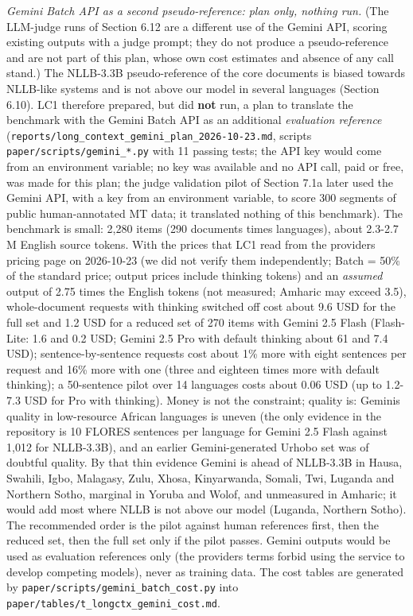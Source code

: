 \emph{Gemini Batch API as a second pseudo-reference: plan only, nothing run.} (The LLM-judge runs of Section 6.12 are a different use of the Gemini API, scoring existing outputs with a judge prompt; they do not produce a pseudo-reference and are not part of this plan, whose own cost estimates and absence of any call stand.) The NLLB-3.3B pseudo-reference of the core documents is biased towards NLLB-like systems and is not above our model in several languages (Section 6.10). LC1 therefore prepared, but did \textbf{not} run, a plan to translate the benchmark with the Gemini Batch API as an additional \emph{evaluation reference} (\texttt{reports/long\_context\_gemini\_plan\_2026-10-23.md}, scripts \texttt{paper/scripts/gemini\_*.py} with 11 passing tests; the API key would come from an environment variable; no key was available and no API call, paid or free, was made for this plan; the judge validation pilot of Section 7.1a later used the Gemini API, with a key from an environment variable, to score 300 segments of public human-annotated MT data; it translated nothing of this benchmark). The benchmark is small: 2,280 items (290 documents times languages), about 2.3-2.7 M English source tokens. With the prices that LC1 read from the provider\textquotesingle s pricing page on 2026-10-23 (we did not verify them independently; Batch = 50\% of the standard price; output prices include thinking tokens) and an \emph{assumed} output of 2.75 times the English tokens (not measured; Amharic may exceed 3.5), whole-document requests with thinking switched off cost about 9.6 USD for the full set and 1.2 USD for a reduced set of 270 items with Gemini 2.5 Flash (Flash-Lite: 1.6 and 0.2 USD; Gemini 2.5 Pro with default thinking about 61 and 7.4 USD); sentence-by-sentence requests cost about 1\% more with eight sentences per request and 16\% more with one (three and eighteen times more with default thinking); a 50-sentence pilot over 14 languages costs about 0.06 USD (up to 1.2-7.3 USD for Pro with thinking). Money is not the constraint; quality is: Gemini\textquotesingle s quality in low-resource African languages is uneven (the only evidence in the repository is 10 FLORES sentences per language for Gemini 2.5 Flash against 1,012 for NLLB-3.3B), and an earlier Gemini-generated Urhobo set was of doubtful quality. By that thin evidence Gemini is ahead of NLLB-3.3B in Hausa, Swahili, Igbo, Malagasy, Zulu, Xhosa, Kinyarwanda, Somali, Twi, Luganda and Northern Sotho, marginal in Yoruba and Wolof, and unmeasured in Amharic; it would add most where NLLB is not above our model (Luganda, Northern Sotho). The recommended order is the pilot against human references first, then the reduced set, then the full set only if the pilot passes. Gemini outputs would be used as evaluation references only (the provider\textquotesingle s terms forbid using the service to develop competing models), never as training data. The cost tables are generated by \texttt{paper/scripts/gemini\_batch\_cost.py} into \texttt{paper/tables/t\_longctx\_gemini\_cost.md}.

